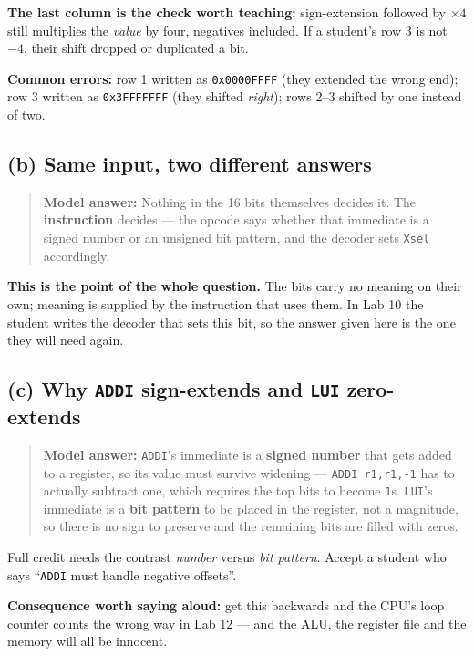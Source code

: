 \documentclass[11pt]{article}
\newcommand{\code}[1]{\texttt{#1}}
\begin{document}
\textbf{The last column is the check worth teaching:} sign-extension followed by
$\times 4$ still multiplies the \emph{value} by four, negatives included. If a
student's row 3 is not $-4$, their shift dropped or duplicated a bit.

\textbf{Common errors:} row 1 written as \code{0x0000FFFF} (they extended the
wrong end); row 3 written as \code{0x3FFFFFFF} (they shifted \emph{right}); rows
2--3 shifted by one instead of two.

\subsection*{(b) Same input, two different answers}

\begin{quote}
\textbf{Model answer:} Nothing in the 16 bits themselves decides it. The
\textbf{instruction} decides --- the opcode says whether that immediate is a
signed number or an unsigned bit pattern, and the decoder sets \code{Xsel}
accordingly.
\end{quote}

\textbf{This is the point of the whole question.} The bits carry no meaning on
their own; meaning is supplied by the instruction that uses them. In Lab 10 the
student writes the decoder that sets this bit, so the answer given here is the one
they will need again.

\subsection*{(c) Why \code{ADDI} sign-extends and \code{LUI} zero-extends}

\begin{quote}
\textbf{Model answer:} \code{ADDI}'s immediate is a \textbf{signed number} that
gets added to a register, so its value must survive widening ---
\code{ADDI r1,r1,-1} has to actually subtract one, which requires the top bits to
become \code{1}s. \code{LUI}'s immediate is a \textbf{bit pattern} to be placed in
the register, not a magnitude, so there is no sign to preserve and the remaining
bits are filled with zeros.
\end{quote}

Full credit needs the contrast \emph{number} versus \emph{bit pattern}. Accept a
student who says ``\code{ADDI} must handle negative offsets''.

\textbf{Consequence worth saying aloud:} get this backwards and the CPU's loop
counter counts the wrong way in Lab 12 --- and the ALU, the register file and the
memory will all be innocent.
\end{document}
